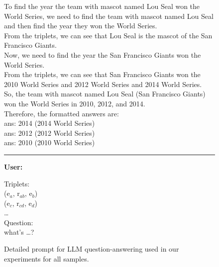 \begin{figure}
\begin{tcolorbox}[colback=gray!5!white, colframe=gray!75!black, title=Input Prompts for KGQA]
To find the year the team with mascot named Lou Seal won the World Series, we need to find the team with mascot named Lou Seal and then find the year they won the World Series.\\

From the triplets, we can see that Lou Seal is the mascot of the San Francisco Giants.\\

Now, we need to find the year the San Francisco Giants won the World Series.\\

From the triplets, we can see that San Francisco Giants won the 2010 World Series and 2012 World Series and 2014 World Series.\\

So, the team with mascot named Lou Seal (San Francisco Giants) won the World Series in 2010, 2012, and 2014.\\

Therefore, the formatted answers are:\\

ans: 2014 (2014 World Series)\\
ans: 2012 (2012 World Series)\\
ans: 2010 (2010 World Series)\\
\rule{\linewidth}{0.4pt} 
\textbf{User:}\; {\color{red}{// Sample to infer}} 

Triplets:\\
(e$_{a}$, r$_{ab}$, e$_b$) \; {\color{red}{// Retrieved triples}} \\
(e$_{c}$, r$_{cd}$, e$_d$)\\
\dots\\
Question:\\
what's \dots? \;  {\color{red}{// Q in datasets}}
\end{tcolorbox}
\vspace{-3mm}
\caption{Detailed prompt for LLM question-answering used in our experiments for all samples.}
\label{fig:prompt_qa_detailed}
\end{figure}

